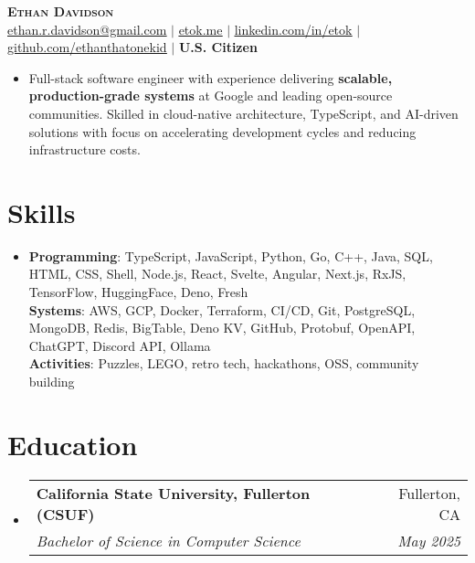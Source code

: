\documentclass[letterpaper,11pt]{article}
\makeatletter
\newcommand{\resumeItem}[1]{
  \item\small{
    {#1 \vspace{-2pt}}
  }
}
\newcommand{\resumeSubheading}[4]{
  \vspace{-2pt}\item
    \begin{tabular*}{0.97\textwidth}[t]{l@{\extracolsep{\fill}}r}
      \textbf{#1} & #2 \\
      \textit{\small#3} & \textit{\small #4} \\
    \end{tabular*}\vspace{-2pt}
}
\newcommand{\resumeSubHeadingListStart}{\begin{itemize}[leftmargin=0.15in, label={}]}
\newcommand{\resumeSubHeadingListEnd}{\end{itemize}}
\makeatother
\begin{document}
\begin{center}
  \textbf{\Huge \scshape Ethan Davidson} \\ \vspace{1pt}
  \small \href{mailto:ethan.r.davidson@gmail.com}{\underline{ethan.r.davidson@gmail.com}} $|$ 
  \href{https://etok.me/}{\underline{etok.me}} $|$
  \href{https://linkedin.com/in/etok}{\underline{linkedin.com/in/etok}} $|$
  \href{https://github.com/ethanthatonekid}{\underline{github.com/ethanthatonekid}} $|$
  \textbf{U.S. Citizen}
\end{center}

\begin{itemize}[leftmargin=0.15in, label={}]
  \resumeItem{Full-stack software engineer with experience delivering \textbf{scalable, production-grade systems} at Google and leading open-source communities. Skilled in cloud-native architecture, TypeScript, and AI-driven solutions with focus on accelerating development cycles and reducing infrastructure costs.}
\end{itemize}

\section{Skills}
\begin{itemize}[leftmargin=0.15in, label={}]
    \resumeItem{
      \textbf{Programming}{: TypeScript, JavaScript, Python, Go, C++, Java, SQL, HTML, CSS, Shell, Node.js, React, Svelte, Angular, Next.js, RxJS, TensorFlow, HuggingFace, Deno, Fresh} \\
      \textbf{Systems}{: AWS, GCP, Docker, Terraform, CI/CD, Git, PostgreSQL, MongoDB, Redis, BigTable, Deno KV, GitHub, Protobuf, OpenAPI, ChatGPT, Discord API, Ollama} \\
      \textbf{Activities}{: Puzzles, LEGO, retro tech, hackathons, OSS, community building}
    }
 \end{itemize}

\section{Education}
\resumeSubHeadingListStart
  \resumeSubheading
    {California State University, Fullerton (CSUF)}{Fullerton, CA}
    {Bachelor of Science in Computer Science}{May 2025}
\resumeSubHeadingListEnd

\end{document}
